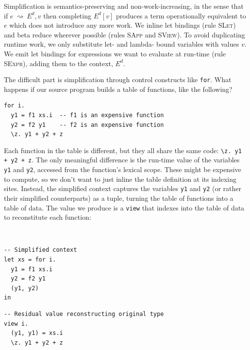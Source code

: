 \documentclass[acmsmall,screen,nonacm]{acmart}
\newlength{\codeindent}
\newcommand{\ttt}[1]{\texttt{#1}}
\newcommand{\tsc}[1]{\textsc{#1}}
\newcommand{\defunc}{~\rightsquigarrow~}
\begin{document}
Simplification is semantics-preserving and non-work-increasing, in the sense that if $e \defunc E^d, v$ then completing $E^d[v]$ produces a term operationally equivalent to $e$ which does not introduce any more work.
We inline let bindings (rule \tsc{SLet}) and beta reduce wherever possible
(rules \tsc{SApp} and \tsc{SView}). To avoid duplicating runtime work, we only
substitute let- and lambda- bound variables with values $v$. We emit let bindings for expressions we want to evaluate at run-time (rule \textsc{SExpr}), adding them
to the context, $E^d$.

The difficult part is simplification through control constructs like \texttt{for}. What
happens if our source program builds a table of functions, like the following?
\begin{Verbatim}[xleftmargin=\codeindent,fontsize=\small]
for i.
  y1 = f1 xs.i  -- f1 is an expensive function
  y2 = f2 y1    -- f2 is an expensive function
  \z. y1 + y2 + z
\end{Verbatim}
Each function in the table is different, but they all share the same code: \texttt{\textbackslash z.
y1 + y2 + z}. The only meaningful difference is the run-time value of the variables
\texttt{y1} and \texttt{y2}, accessed from the function's lexical scope. These might be expensive to compute, so we don't want to just inline the table definition at its indexing sites.
Instead, the simplified context captures the variables \texttt{y1} and
\texttt{y2} (or rather their simplified counterparts) as a tuple, turning the table of
functions into a table of data. The value we produce is a \ttt{view}
that indexes into the table of data to reconstitute each function:

\mbox{}\vspace{-0.15cm}\\
\begin{minipage}{0.35\textwidth}
\begin{Verbatim}[xleftmargin=\codeindent,fontsize=\small]
-- Simplified context
let xs = for i.
  y1 = f1 xs.i
  y2 = f2 y1
  (y1, y2)
in
\end{Verbatim}
\end{minipage}%
\begin{minipage}{0.5\textwidth}
\begin{Verbatim}[xleftmargin=\codeindent,fontsize=\small]
-- Residual value reconstructing original type
view i.
  (y1, y1) = xs.i
  \z. y1 + y2 + z
\end{Verbatim}
\end{minipage}
\end{document}
